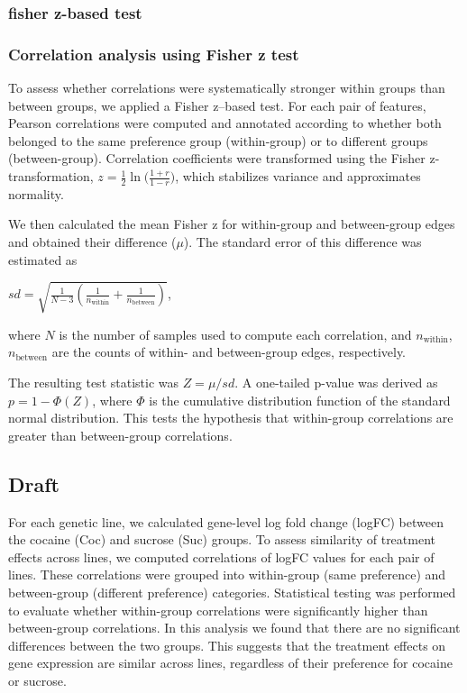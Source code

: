 \documentclass[11pt]{article}
\begin{document}
\subsubsection{fisher z-based test}
\label{sec:orgca29950}
\subsubsection{Correlation analysis using Fisher z test}
\label{sec:orgeaf01bb}
To assess whether correlations were systematically stronger within groups
than between groups, we applied a Fisher z–based test. For each pair of
features, Pearson correlations were computed and annotated according to
whether both belonged to the same preference group (within-group) or to
different groups (between-group). Correlation coefficients were transformed
using the Fisher z-transformation,
\(z = \tfrac{1}{2}\ln\big(\tfrac{1+r}{1-r}\big)\), which stabilizes
variance and approximates normality.

We then calculated the mean Fisher z for within-group and between-group
edges and obtained their difference (\(\mu\)). The standard error of this
difference was estimated as

\(sd = \sqrt{\frac{1}{N-3}\left(\frac{1}{n_{\text{within}}} +
\frac{1}{n_{\text{between}}}\right)}\),

where \(N\) is the number of samples used to compute each correlation, and
\(n_{\text{within}}\), \(n_{\text{between}}\) are the counts of within- and
between-group edges, respectively.

The resulting test statistic was \(Z = \mu / sd\). A one-tailed p-value
was derived as \(p = 1 - \Phi(Z)\), where \(\Phi\) is the cumulative
distribution function of the standard normal distribution. This tests the
hypothesis that within-group correlations are greater than between-group
correlations.
\subsection{Draft}
\label{sec:orgafa856e}
For each genetic line, we calculated gene-level log fold change (logFC) between the cocaine (Coc) and sucrose (Suc) groups.
To assess similarity of treatment effects across lines, we computed correlations of logFC values for each pair of lines.
These correlations were grouped into within-group (same preference) and between-group (different preference) categories.
Statistical testing was performed to evaluate whether within-group correlations were significantly higher than between-group correlations.
In this analysis we found that there are no significant differences between the two groups.
This suggests that the treatment effects on gene expression are similar across lines, regardless of their preference for cocaine or sucrose.
\end{document}
